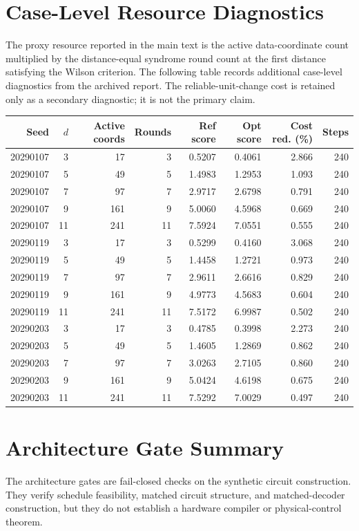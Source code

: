 \documentclass[11pt]{article}
\begin{document}
\clearpage
\section{Case-Level Resource Diagnostics}
The proxy resource reported in the main text is the active data-coordinate count
multiplied by the distance-equal syndrome round count at the first distance
satisfying the Wilson criterion. The following table records additional
case-level diagnostics from the archived report. The reliable-unit-change cost
is retained only as a secondary diagnostic; it is not the primary claim.

\begin{center}
\scriptsize
\begin{tabular}{rrrrrrrr}
\toprule
Seed & $d$ & Active coords & Rounds & Ref score & Opt score & Cost red. (\%) & Steps \\
\midrule
20290107 & 3 & 17 & 3 & 0.5207 & 0.4061 & 2.866 & 240 \\
20290107 & 5 & 49 & 5 & 1.4983 & 1.2953 & 1.093 & 240 \\
20290107 & 7 & 97 & 7 & 2.9717 & 2.6798 & 0.791 & 240 \\
20290107 & 9 & 161 & 9 & 5.0060 & 4.5968 & 0.669 & 240 \\
20290107 & 11 & 241 & 11 & 7.5924 & 7.0551 & 0.555 & 240 \\
20290119 & 3 & 17 & 3 & 0.5299 & 0.4160 & 3.068 & 240 \\
20290119 & 5 & 49 & 5 & 1.4458 & 1.2721 & 0.973 & 240 \\
20290119 & 7 & 97 & 7 & 2.9611 & 2.6616 & 0.829 & 240 \\
20290119 & 9 & 161 & 9 & 4.9773 & 4.5683 & 0.604 & 240 \\
20290119 & 11 & 241 & 11 & 7.5172 & 6.9987 & 0.502 & 240 \\
20290203 & 3 & 17 & 3 & 0.4785 & 0.3998 & 2.273 & 240 \\
20290203 & 5 & 49 & 5 & 1.4605 & 1.2869 & 0.862 & 240 \\
20290203 & 7 & 97 & 7 & 3.0263 & 2.7105 & 0.860 & 240 \\
20290203 & 9 & 161 & 9 & 5.0424 & 4.6198 & 0.675 & 240 \\
20290203 & 11 & 241 & 11 & 7.5292 & 7.0029 & 0.497 & 240 \\
\bottomrule
\end{tabular}
\end{center}

\section{Architecture Gate Summary}
The architecture gates are fail-closed checks on the synthetic circuit
construction. They verify schedule feasibility, matched circuit structure, and
matched-decoder construction, but they do not establish a hardware compiler or
physical-control theorem.
\end{document}
